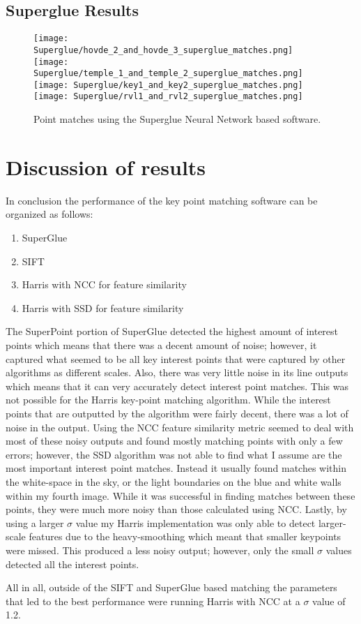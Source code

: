 \documentclass{article}
\begin{document}
\subsection{Superglue Results}
\begin{figure}[H]
    \centering
    \texttt{[image: Superglue/hovde\_2\_and\_hovde\_3\_superglue\_matches.png]}
    \texttt{[image: Superglue/temple\_1\_and\_temple\_2\_superglue\_matches.png]}
    \texttt{[image: Superglue/key1\_and\_key2\_superglue\_matches.png]}
    \texttt{[image: Superglue/rvl1\_and\_rvl2\_superglue\_matches.png]}
    \caption{Point matches using the Superglue Neural Network based software.}
    \label{fig:enter-label}
\end{figure}

\section{Discussion of results}
In conclusion the performance of the key point matching software can be organized as follows:
\begin{enumerate}
    \item SuperGlue
    \item SIFT
    \item Harris with NCC for feature similarity
    \item Harris with SSD for feature similarity
\end{enumerate}
The SuperPoint portion of SuperGlue detected the highest amount of interest points which means that there was a decent amount of noise; however, it captured what seemed to be all key interest points that were captured by other algorithms as different scales. Also, there was very little noise in its line outputs which means that it can very accurately detect interest point matches. This was not possible for the Harris key-point matching algorithm. While the interest points that are outputted by the algorithm were fairly decent, there was a lot of noise in the output. Using the NCC feature similarity metric seemed to deal with most of these noisy outputs and found mostly matching points with only a few errors; however, the SSD algorithm was not able to find what I assume are the most important interest point matches. Instead it usually found matches within the white-space in the sky, or the light boundaries on the blue and white walls within my fourth image. While it was successful in finding matches between these points, they were much more noisy than those calculated using NCC. Lastly, by using a larger $\sigma$ value my Harris implementation was only able to detect larger-scale features due to the heavy-smoothing which meant that smaller keypoints were missed. This produced a less noisy output; however, only the small $\sigma$ values detected all the interest points. 

All in all, outside of the SIFT and SuperGlue based matching the parameters that led to the best performance were running Harris with NCC at a $\sigma$ value of 1.2.  


\printbibliography
\end{document}

